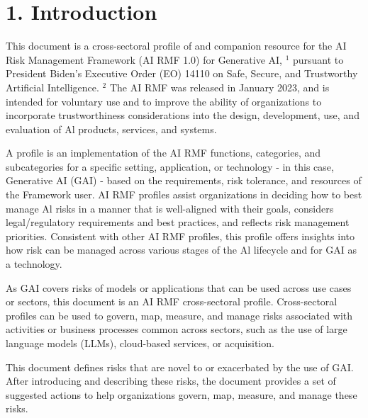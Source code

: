 \documentclass[10pt]{article}
\begin{document}
\section*{1. Introduction}
This document is a cross-sectoral profile of and companion resource for the AI Risk Management Framework (AI RMF 1.0) for Generative AI, ${ }^{1}$ pursuant to President Biden's Executive Order (EO) 14110 on Safe, Secure, and Trustworthy Artificial Intelligence. ${ }^{2}$ The AI RMF was released in January 2023, and is intended for voluntary use and to improve the ability of organizations to incorporate trustworthiness considerations into the design, development, use, and evaluation of Al products, services, and systems.

A profile is an implementation of the AI RMF functions, categories, and subcategories for a specific setting, application, or technology - in this case, Generative AI (GAI) - based on the requirements, risk tolerance, and resources of the Framework user. AI RMF profiles assist organizations in deciding how to best manage Al risks in a manner that is well-aligned with their goals, considers legal/regulatory requirements and best practices, and reflects risk management priorities. Consistent with other AI RMF profiles, this profile offers insights into how risk can be managed across various stages of the Al lifecycle and for GAI as a technology.

As GAI covers risks of models or applications that can be used across use cases or sectors, this document is an AI RMF cross-sectoral profile. Cross-sectoral profiles can be used to govern, map, measure, and manage risks associated with activities or business processes common across sectors, such as the use of large language models (LLMs), cloud-based services, or acquisition.

This document defines risks that are novel to or exacerbated by the use of GAI. After introducing and describing these risks, the document provides a set of suggested actions to help organizations govern, map, measure, and manage these risks.
\end{document}
